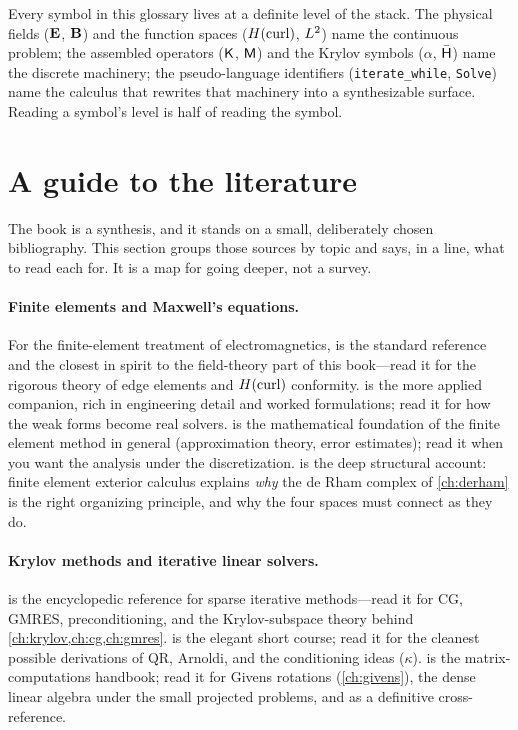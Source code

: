 \begin{keyidea}
Every symbol in this glossary lives at a definite level of the stack. The
physical fields ($\mathbf{E}$, $\mathbf{B}$) and the function spaces ($H(\mathrm{curl})$, $L^2$) name
the continuous problem; the assembled operators ($\mathsf{K}$, $\mathsf{M}$) and the
Krylov symbols ($\alpha$, $\bar{\mathsf{H}}$) name the discrete machinery; the
pseudo-language identifiers (\texttt{iterate\_while}, \texttt{Solve}) name the
calculus that rewrites that machinery into a synthesizable surface. Reading a
symbol's level is half of reading the symbol.
\end{keyidea}

\section{A guide to the literature}
\label{sec:furtherreading-app}

The book is a synthesis, and it stands on a small, deliberately chosen
bibliography. This section groups those sources by topic and says, in a line,
what to read each for. It is a map for going deeper, not a survey.

\paragraph{Finite elements and Maxwell's equations.}
For the finite-element treatment of electromagnetics, \citet{monk2003} is the
standard reference and the closest in spirit to the field-theory part of this
book---read it for the rigorous theory of edge elements and $H(\mathrm{curl})$
conformity. \citet{jin2014} is the more applied companion, rich in engineering
detail and worked formulations; read it for how the weak forms become real
solvers. \citet{brennerscott2008} is the mathematical foundation of the finite
element method in general (approximation theory, error estimates); read it when
you want the analysis under the discretization. \citet{arnold2006feec} is the
deep structural account: finite element exterior calculus explains \emph{why}
the de Rham complex of \cref{ch:derham} is the right organizing principle, and
why the four spaces must connect as they do.

\paragraph{Krylov methods and iterative linear solvers.}
\citet{saad2003} is the encyclopedic reference for sparse iterative
methods---read it for CG, GMRES, preconditioning, and the Krylov-subspace theory
behind \cref{ch:krylov,ch:cg,ch:gmres}. \citet{trefethenbau1997} is the elegant
short course; read it for the cleanest possible derivations of QR, Arnoldi, and
the conditioning ideas ($\kappa$). \citet{golubvanloan2013} is the matrix-computations
handbook; read it for Givens rotations (\cref{ch:givens}), the dense linear
algebra under the small projected problems, and as a definitive cross-reference.

